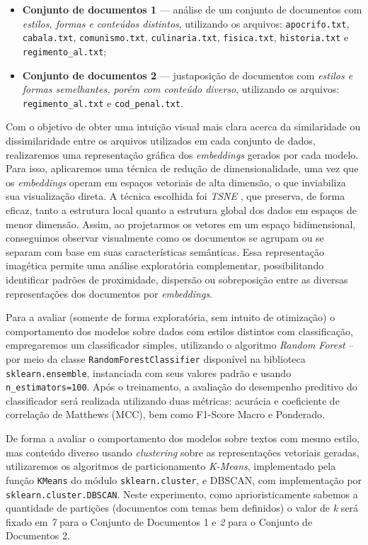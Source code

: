 \begin{itemize}
    \item \textbf{Conjunto de documentos 1} — análise de um conjunto de documentos com \textit{estilos, formas e conteúdos distintos}, utilizando os arquivos: \texttt{apocrifo.txt}, \texttt{cabala.txt}, \texttt{comunismo.txt}, \texttt{culinaria.txt}, \texttt{fisica.txt}, \texttt{historia.txt} e \texttt{regimento\_al.txt};
    \item \textbf{Conjunto de documentos 2} — justaposição de documentos com \textit{estilos e formas semelhantes, porém com conteúdo diverso}, utilizando os arquivos: \texttt{regimento\_al.txt} e \texttt{cod\_penal.txt}.
\end{itemize}

Com o objetivo de obter uma intuição visual mais clara acerca da similaridade ou dissimilaridade entre os arquivos utilizados em cada conjunto de dados, realizaremos uma representação gráfica dos \textit{embeddings} gerados por cada modelo. Para isso, aplicaremos uma técnica de redução de dimensionalidade, uma vez que os \textit{embeddings} operam em espaços vetoriais de alta dimensão, o que inviabiliza sua visualização direta. A técnica escolhida foi \textit{\ac{TSNE}} \cite{TSNE}, que preserva, de forma eficaz, tanto a estrutura local quanto a estrutura global dos dados em espaços de menor dimensão. Assim, ao projetarmos os vetores em um espaço bidimensional, conseguimos observar visualmente como os documentos se agrupam ou se separam com base em suas características semânticas. Essa representação imagética permite uma análise exploratória complementar, possibilitando identificar padrões de proximidade, dispersão ou sobreposição entre as diversas representações dos documentos por \textit{embeddings}.

Para a avaliar (somente de forma exploratória, sem intuito de otimização) o comportamento dos modelos sobre dados com estilos distintos com classificação, empregaremos um classificador simples, utilizando o algoritmo \textit{Random Forest} -- por meio da classe \texttt{RandomForestClassifier} disponível na biblioteca \texttt{sklearn.ensemble}, instanciada com seus valores padrão e usando \texttt{n\_estimators=100}. Após o treinamento, a avaliação do desempenho preditivo do classificador será realizada utilizando duas métricas: acurácia e coeficiente de correlação de Matthews (MCC), bem como F1-Score Macro e Ponderado.

De forma a avaliar o comportamento dos modelos sobre textos com mesmo estilo, mas conteúdo diverso usando \textit{clustering} sobre as representações vetoriais geradas, utilizaremos os algoritmos de particionamento \textit{K-Means}, implementado pela função \texttt{KMeans} do módulo \texttt{sklearn.cluster}, e DBSCAN, com implementação por \texttt{sklearn.cluster.DBSCAN}. Neste experimento, como aprioristicamente sabemos a quantidade de partições (documentos com temas bem definidos) o valor de \textit{k} será fixado em \textit{7} para o Conjunto de Documentos 1 e \textit{2} para o Conjunto de Documentos 2.

